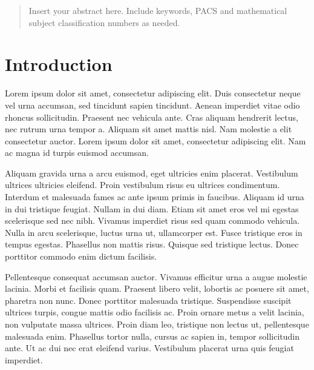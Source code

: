 
\date{Received: date / Accepted: date}


\maketitle

\begin{abstract}
Insert your abstract here. Include keywords, PACS and mathematical
subject classification numbers as needed.
\end{abstract}

\section{Introduction}
\label{intro}
Lorem ipsum dolor sit amet, consectetur adipiscing elit. Duis consectetur neque vel urna accumsan, sed tincidunt sapien tincidunt. Aenean imperdiet vitae odio rhoncus sollicitudin. Praesent nec vehicula ante. Cras aliquam hendrerit lectus, nec rutrum urna tempor a. Aliquam sit amet mattis nisl. Nam molestie a elit consectetur auctor. Lorem ipsum dolor sit amet, consectetur adipiscing elit. Nam ac magna id turpis euismod accumsan.

Aliquam gravida urna a arcu euismod, eget ultricies enim placerat. Vestibulum ultrices ultricies eleifend. Proin vestibulum risus eu ultrices condimentum. Interdum et malesuada fames ac ante ipsum primis in faucibus. Aliquam id urna in dui tristique feugiat. Nullam in dui diam. Etiam sit amet eros vel mi egestas scelerisque sed nec nibh. Vivamus imperdiet risus sed quam commodo vehicula. Nulla in arcu scelerisque, luctus urna ut, ullamcorper est. Fusce tristique eros in tempus egestas. Phasellus non mattis risus. Quisque sed tristique lectus. Donec porttitor commodo enim dictum facilisis.

Pellentesque consequat accumsan auctor. Vivamus efficitur urna a augue molestie lacinia. Morbi et facilisis quam. Praesent libero velit, lobortis ac posuere sit amet, pharetra non nunc. Donec porttitor malesuada tristique. Suspendisse suscipit ultrices turpis, congue mattis odio facilisis ac. Proin ornare metus a velit lacinia, non vulputate massa ultrices. Proin diam leo, tristique non lectus ut, pellentesque malesuada enim. Phasellus tortor nulla, cursus ac sapien in, tempor sollicitudin ante. Ut ac dui nec erat eleifend varius. Vestibulum placerat urna quis feugiat imperdiet.

